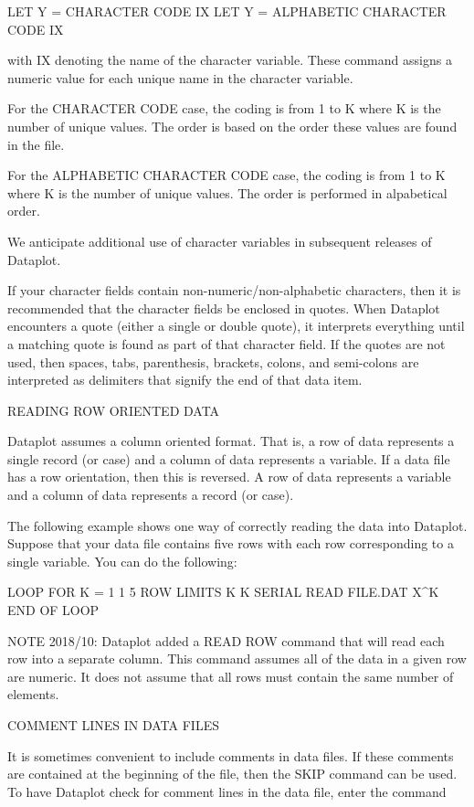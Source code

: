         LET Y = CHARACTER CODE IX
        LET Y = ALPHABETIC CHARACTER CODE IX

      with IX denoting the name of the character variable.  These
      command assigns a numeric value for each unique name in
      the character variable.

      For the CHARACTER CODE case, the coding is from 1 to K where
      K is the number of unique values.  The order is based on
      the order these values are found in the file.

      For the ALPHABETIC CHARACTER CODE case, the coding is from
      1 to K where K is the number of unique values.  The order is
      performed in alpabetical order.

We anticipate additional use of character variables in subsequent
releases of Dataplot.

If your character fields contain non-numeric/non-alphabetic characters,
then it is recommended that the character fields be enclosed in
quotes.  When Dataplot encounters a quote (either a single or double
quote), it interprets everything until a matching quote is found
as part of that character field.  If the quotes are not used,
then spaces, tabs, parenthesis, brackets, colons, and semi-colons
are interpreted as delimiters that signify the end of that data item.


READING ROW ORIENTED DATA

Dataplot assumes a column oriented format.  That is, a row of
data represents a single record (or case) and a column of data 
represents a variable.  If a data file has a row orientation, then
this is reversed.  A row of data represents a variable and a column
of data represents a record (or case).

The following example shows one way of correctly reading the data
into Dataplot.  Suppose that your data file contains five rows with
each row corresponding to a single variable.  You can do the following:

   LOOP FOR K = 1 1 5
      ROW LIMITS K K
      SERIAL READ FILE.DAT  X^K
   END OF LOOP

NOTE 2018/10: Dataplot added a READ ROW command that will read each row
              into a separate column.  This command assumes all of the
              data in a given row are numeric.  It does not assume that
              all rows must contain the same number of elements.

COMMENT LINES IN DATA FILES

It is sometimes convenient to include comments in data files.
If these comments are contained at the beginning of the file, then
the SKIP command can be used.  To have Dataplot check for comment
lines in the data file, enter the command

